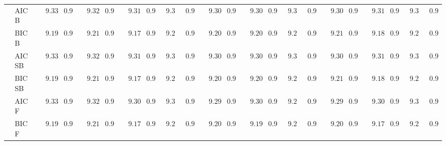 \begin{tabular}{p{0.2cm}p{1cm}|p{0.6cm}p{0.6cm}|p{0.6cm}p{0.6cm}p{0.6cm}p{0.6cm}p{0.6cm}p{0.6cm}|p{0.6cm}p{0.6cm}p{0.6cm}p{0.6cm}p{0.6cm}p{0.6cm}|p{0.6cm}p{0.6cm}p{0.6cm}p{0.6cm}p{0.6cm}p{0.6cm}}
 & AIC B  & $\phantom{00}9.33$ & $\phantom{0}0.97$ & $\phantom{00}9.32$ & $\phantom{0}0.98$ & $\phantom{00}9.31$ & $\phantom{0}0.96$ & $\phantom{0}9.35$ & $\phantom{0}0.98$ & $\phantom{00}9.30$ & $\phantom{0}0.96$ & $\phantom{00}9.30$ & $\phantom{0}0.97$ & $\phantom{0}9.31$ & $\phantom{0}0.98$ & $\phantom{00}9.30$ & $\phantom{0}0.96$ & $\phantom{00}9.31$ & $\phantom{0}0.95$ & $\phantom{0}9.33$ & $\phantom{0}0.97$ \\
 & BIC B  & $\phantom{00}9.19$ & $\phantom{0}0.94$ & $\phantom{00}9.21$ & $\phantom{0}0.96$ & $\phantom{00}9.17$ & $\phantom{0}0.95$ & $\phantom{0}9.26$ & $\phantom{0}0.96$ & $\phantom{00}9.20$ & $\phantom{0}0.92$ & $\phantom{00}9.20$ & $\phantom{0}0.93$ & $\phantom{0}9.29$ & $\phantom{0}0.92$ & $\phantom{00}9.21$ & $\phantom{0}0.95$ & $\phantom{00}9.18$ & $\phantom{0}0.92$ & $\phantom{0}9.26$ & $\phantom{0}0.96$ \\
 & AIC SB  & $\phantom{00}9.33$ & $\phantom{0}0.97$ & $\phantom{00}9.32$ & $\phantom{0}0.98$ & $\phantom{00}9.31$ & $\phantom{0}0.96$ & $\phantom{0}9.35$ & $\phantom{0}0.98$ & $\phantom{00}9.30$ & $\phantom{0}0.96$ & $\phantom{00}9.30$ & $\phantom{0}0.97$ & $\phantom{0}9.31$ & $\phantom{0}0.98$ & $\phantom{00}9.30$ & $\phantom{0}0.96$ & $\phantom{00}9.31$ & $\phantom{0}0.95$ & $\phantom{0}9.33$ & $\phantom{0}0.97$ \\
 & BIC SB  & $\phantom{00}9.19$ & $\phantom{0}0.94$ & $\phantom{00}9.21$ & $\phantom{0}0.96$ & $\phantom{00}9.17$ & $\phantom{0}0.95$ & $\phantom{0}9.26$ & $\phantom{0}0.96$ & $\phantom{00}9.20$ & $\phantom{0}0.92$ & $\phantom{00}9.20$ & $\phantom{0}0.93$ & $\phantom{0}9.29$ & $\phantom{0}0.92$ & $\phantom{00}9.21$ & $\phantom{0}0.95$ & $\phantom{00}9.18$ & $\phantom{0}0.92$ & $\phantom{0}9.26$ & $\phantom{0}0.96$ \\
 & AIC F  & $\phantom{00}9.33$ & $\phantom{0}0.97$ & $\phantom{00}9.32$ & $\phantom{0}0.98$ & $\phantom{00}9.30$ & $\phantom{0}0.96$ & $\phantom{0}9.33$ & $\phantom{0}0.98$ & $\phantom{00}9.29$ & $\phantom{0}0.96$ & $\phantom{00}9.30$ & $\phantom{0}0.97$ & $\phantom{0}9.29$ & $\phantom{0}0.97$ & $\phantom{00}9.29$ & $\phantom{0}0.96$ & $\phantom{00}9.30$ & $\phantom{0}0.95$ & $\phantom{0}9.30$ & $\phantom{0}0.96$ \\
 & BIC F  & $\phantom{00}9.19$ & $\phantom{0}0.94$ & $\phantom{00}9.21$ & $\phantom{0}0.96$ & $\phantom{00}9.17$ & $\phantom{0}0.95$ & $\phantom{0}9.25$ & $\phantom{0}0.95$ & $\phantom{00}9.20$ & $\phantom{0}0.92$ & $\phantom{00}9.19$ & $\phantom{0}0.94$ & $\phantom{0}9.28$ & $\phantom{0}0.91$ & $\phantom{00}9.20$ & $\phantom{0}0.95$ & $\phantom{00}9.17$ & $\phantom{0}0.92$ & $\phantom{0}9.25$ & $\phantom{0}0.98$ \\

\end{tabular}

